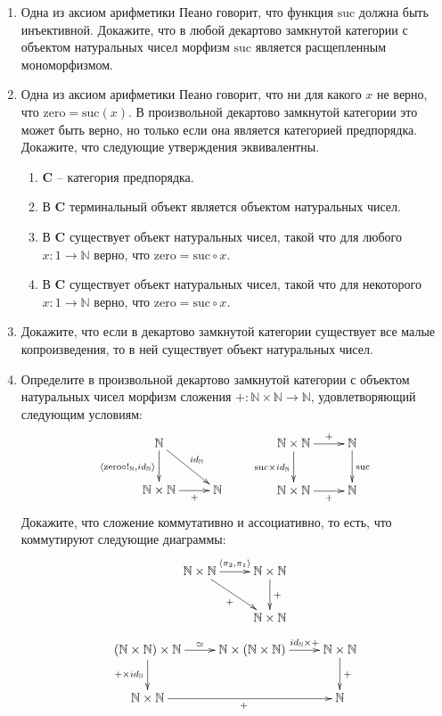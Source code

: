 \documentclass[draft]{article}
\newcommand{\cat}[1]{\mathbf{#1}}
\renewcommand{\C}{\cat{C}}
\newcommand{\zero}{\mathrm{zero}}
\newcommand{\suc}{\mathrm{suc}}
\begin{document}
\begin{enumerate}
\item Одна из аксиом арифметики Пеано говорит, что функция $\suc$ должна быть инъективной.
Докажите, что в любой декартово замкнутой категории с объектом натуральных чисел морфизм $\suc$ является расщепленным мономорфизмом.

\item Одна из аксиом арифметики Пеано говорит, что ни для какого $x$ не верно, что $\zero = \suc(x)$.
В произвольной декартово замкнутой категории это может быть верно, но только если она является категорией предпорядка.
Докажите, что следующие утверждения эквивалентны.
\begin{enumerate}
\item $\C$ -- категория предпорядка.
\item В $\C$ терминальный объект является объектом натуральных чисел.
\item В $\C$ существует объект натуральных чисел, такой что для любого $x : 1 \to \mathbb{N}$ верно, что $\zero = \suc \circ x$.
\item В $\C$ существует объект натуральных чисел, такой что для некоторого $x : 1 \to \mathbb{N}$ верно, что $\zero = \suc \circ x$.
\end{enumerate}

\item Докажите, что если в декартово замкнутой категории существует все малые копроизведения, то в ней существует объект натуральных чисел.

\item Определите в произвольной декартово замкнутой категории с объектом натуральных чисел морфизм сложения $+ : \mathbb{N} \times \mathbb{N} \to \mathbb{N}$, удовлетворяющий следующим условиям:
\[ \xymatrix{ \mathbb{N} \ar[d]_{\langle \zero \circ !_\mathbb{N}, id_\mathbb{N} \rangle} \ar[rd]^{id_\mathbb{N}} \\
              \mathbb{N} \times \mathbb{N} \ar[r]_-{+} & \mathbb{N}
            }
\qquad
   \xymatrix{ \mathbb{N} \times \mathbb{N} \ar[r]^-{+} \ar[d]_{\suc \times id_\mathbb{N}} & \mathbb{N} \ar[d]^{\suc} \\
              \mathbb{N} \times \mathbb{N} \ar[r]_-{+} & \mathbb{N}
            } \]
Докажите, что сложение коммутативно и ассоциативно, то есть, что коммутируют следующие диаграммы:
\[ \xymatrix{ \mathbb{N} \times \mathbb{N} \ar[r]^{\langle \pi_2, \pi_1 \rangle} \ar[rd]_{+} & \mathbb{N} \times \mathbb{N} \ar[d]^{+} \\
                                                                           & \mathbb{N} \times \mathbb{N}
            } \]
\[ \xymatrix{ (\mathbb{N} \times \mathbb{N}) \times \mathbb{N} \ar[r]^{\simeq} \ar[d]_{+ \times id_\mathbb{N}} & \mathbb{N} \times (\mathbb{N} \times \mathbb{N}) \ar[r]^-{id_\mathbb{N} \times +} & \mathbb{N} \times \mathbb{N} \ar[d]^{+} \\
              \mathbb{N} \times \mathbb{N} \ar[rr]_{+} & & \mathbb{N}
            } \]

\end{enumerate}
\end{document}
